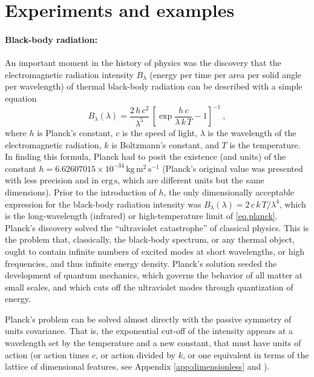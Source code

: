 \documentclass[]{article} %
\newcommand{\unit}[1]{\mathrm{#1}}
\newcommand{\kg}{\unit{kg}}
\newcommand{\m}{\unit{m}}
\newcommand{\s}{\unit{s}}
\begin{document}
\section{Experiments and examples}\label{sec:experiments}

\paragraph{Black-body radiation:}
An important moment in the history of physics was the discovery that the electromagnetic radiation intensity $B_\lambda$ (energy per time per area per solid angle per wavelength) of thermal black-body radiation can be described with a simple equation \citep{planck}
\begin{equation} \label{eq.planck}
    B_\lambda(\lambda) = \frac{2\,h\,c^2}{\lambda^5}\,\left[\exp\frac{h\,c}{\lambda\,k\,T} - 1\right]^{-1} ~,
\end{equation}
where $h$ is Planck's constant,
$c$ is the speed of light,
$\lambda$ is the wavelength of the electromagnetic radiation,
$k$ is Boltzmann's constant,
and $T$ is the temperature.
In finding this formula, Planck had to posit the existence (and units) of the constant $h=6.62607015\times 10^{-34}\,\kg\,\m^2\,\s^{-1}$ (Planck's original value was presented with less precision and in $\mathrm{erg}\,\s$, which are different units but the same dimensions).
Prior to the introduction of $h$, the only dimensionally acceptable expression for the black-body radiation intensity was $B_\lambda(\lambda)=2\,c\,k\,T/\lambda^4$, which is the long-wavelength (infrared) or high-temperature limit of \eqref{eq.planck}.
Planck's discovery solved the ``ultraviolet catastrophe'' of classical physics.
This is the problem that, classically, the black-body spectrum, or any thermal object, ought to contain infinite numbers of excited modes at short wavelengths, or high frequencies, and thus infinite energy density.
Planck's solution seeded the development of quantum mechanics, which governs the behavior of all matter at small scales, and which cuts off the ultraviolet modes through quantization of energy.

Planck's problem can be solved almost directly with the passive symmetry of units covariance.
That is, the exponential cut-off of the intensity appears at a wavelength set by the temperature and a new constant, that must have units of action (or action times $c$, or action divided by $k$, or one equivalent in terms of the lattice of dimensional features, see Appendix \ref{app:dimensionless} and \citealt{villar2022dimensionless}).
\end{document}
